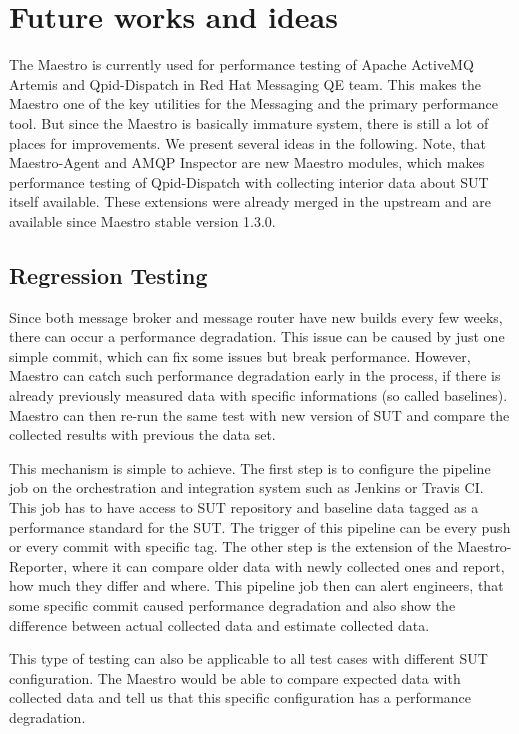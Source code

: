 
\chapter{Future works and ideas}
\label{Future works and ideas}
The Maestro is currently used for performance testing of Apache ActiveMQ Artemis and Qpid-Dispatch in Red Hat Messaging QE team. This makes the Maestro one of the key utilities for the Messaging and the primary performance tool. But since the Maestro is basically immature system, there is still a lot of places for improvements. We present several ideas in the following. Note, that Maestro-Agent and AMQP Inspector are new Maestro modules, which makes performance testing of Qpid-Dispatch with collecting interior data about SUT itself available. These extensions were already merged in the upstream and are available since Maestro stable version 1.3.0.

\section{Regression Testing}
Since both message broker and message router have new builds every few weeks, there can occur a performance degradation. This issue can be caused by just one simple commit, which can fix some issues but break performance. However, Maestro can catch such performance degradation early in the process, if there is already previously measured data with specific informations (so called baselines). Maestro can then re-run the same test with new version of SUT and compare the collected results with previous the data set.

This mechanism is simple to achieve. The first step is to configure the pipeline job on the orchestration and integration system such as Jenkins or Travis CI. This job has to have access to SUT repository and baseline data tagged as a performance standard for the SUT. The trigger of this pipeline can be every push or every commit with specific tag. The other step is the extension of the Maestro-Reporter, where it can compare older data with newly collected ones and report, how much they differ and where. This pipeline job then can alert engineers, that some specific commit caused performance degradation and also show the difference between actual collected data and estimate collected data.

This type of testing can also be applicable to all test cases with different SUT configuration. The Maestro would be able to compare expected data with collected data and tell us that this specific configuration has a performance degradation.

